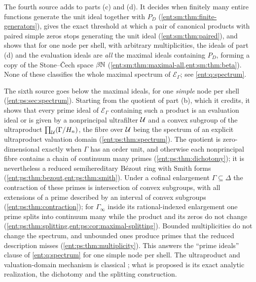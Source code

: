 \documentclass[11pt]{article}
\theoremstyle{plain}
\theoremstyle{plain}
\theoremstyle{plain}
\theoremstyle{definition}
\theoremstyle{definition}
\theoremstyle{definition}
\theoremstyle{definition}
\theoremstyle{remark}
\newcommand{\E}{\mathcal E_\Gamma}
\begin{document}
The fourth source adds to parts (c) and (d). It decides when finitely many
entire functions generate the unit ideal together with $P_D$
(\cref{ent:sm:thm:finite-generators}), gives the exact threshold at which a
pair of canonical products with paired simple zeros stops generating the
unit ideal (\cref{ent:sm:thm:paired}), and shows that for one node per shell,
with arbitrary multiplicities, the ideals of part (d) and the evaluation
ideals are \emph{all} the maximal ideals containing $P_D$, forming a copy of
the Stone--\v{C}ech space $\beta\mathbb N$
(\cref{ent:sm:thm:maximal-all,ent:sm:thm:beta}). None of these classifies
the whole maximal spectrum of $\E$; see \cref{ent:q:spectrum}.

The sixth source goes below the maximal ideals, for one \emph{simple} node
per shell (\cref{ent:ps:sec:spectrum}). Starting from the quotient of part
(b), which it credits, it shows that every prime ideal of $\E$ containing
such a product is an evaluation ideal or is given by a nonprincipal
ultrafilter $\mathcal U$ and a convex subgroup of the ultraproduct
$\prod_\mathcal U(\Gamma/H_n)$, the fibre over $\mathcal U$ being the spectrum of an
explicit ultraproduct valuation domain (\cref{ent:ps:thm:spectrum}). The
quotient is zero-dimensional exactly when $\Gamma$ has an order unit, and
otherwise each nonprincipal fibre contains a chain of continuum many primes
(\cref{ent:ps:thm:dichotomy}); it is nevertheless a reduced semihereditary
B\'ezout ring with Smith forms (\cref{ent:ps:thm:bezout,ent:ps:thm:smith}).
Under a cofinal enlargement $\Gamma\subseteq\Delta$ the contraction of these
primes is intersection of convex subgroups, with all extensions of a prime
described by an interval of convex subgroups
(\cref{ent:ps:thm:contraction}); for $\Gamma_\infty$ inside its
rational-indexed enlargement one prime splits into continuum many while the
product and its zeros do not change
(\cref{ent:ps:thm:splitting,ent:ps:cor:maximal-splitting}). Bounded
multiplicities do not change the spectrum, and unbounded ones produce primes
that the reduced description misses (\cref{ent:ps:thm:multiplicity}). This
answers the ``prime ideals'' clause of \cref{ent:q:spectrum} for one simple
node per shell. The ultraproduct and valuation-domain mechanism is classical
\cite{FFW,StacksValuation}; what is proposed is its exact analytic
realization, the dichotomy and the splitting construction.
\end{document}
